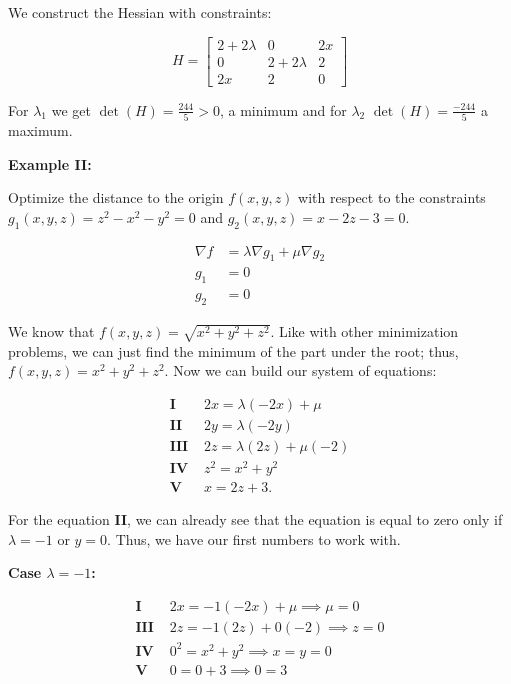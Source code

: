 We construct the Hessian with constraints:

\[
    H = \begin{bmatrix}
    2 + 2\lambda & 0 & 2x \\
    0 & 2 + 2\lambda & 2 \\
    2x & 2 & 0
    \end{bmatrix}
\]

For \(\lambda_1\) we get \( \det(H) =  \frac{244}{5} > 0 \), a minimum 
and for \(\lambda_2\) \(\det(H) = \frac{-244}{5}\) a maximum.

\textbf{Example II:}

Optimize the distance to the origin \(f(x,y,z)\) with respect to the constraints 
\(g_1(x,y,z) = z^2 - x^2 - y^2 = 0\) and \(g_2(x,y,z) = x - 2z - 3 = 0\).

\begin{align*}
    \nabla f &= \lambda \nabla g_1 + \mu \nabla g_2 \\
    g_1 &= 0 \\
    g_2 &= 0 
\end{align*}

We know that \(f(x,y,z) = \sqrt{x^2 + y^2 + z^2}\). Like with other minimization problems, we can 
just find the minimum of the part under the root; thus, \(f(x,y,z) = x^2 + y^2 + z^2\). Now we can 
build our system of equations:

\begin{align*}
    \textbf{I   } &2x = \lambda(-2x) + \mu \\
    \textbf{II  } &2y = \lambda(-2y) \\
    \textbf{III } &2z = \lambda(2z) + \mu(-2) \\
    \textbf{IV  } &z^2 = x^2 + y^2 \\
    \textbf{V   } &x = 2z + 3.   
\end{align*}

For the equation \textbf{II}, we can already see that the equation is equal to zero only if 
\(\lambda = -1\) or \(y = 0\). Thus, we have our first numbers to work with.

\textbf{Case \(\lambda = -1\):}

\begin{align*}
    \textbf{I   } &2x = -1(-2x) + \mu  \implies \mu = 0\\
    \textbf{III } &2z = -1(2z) + 0(-2) \implies z = 0 \\
    \textbf{IV  } &0^2 = x^2 + y^2  \implies x = y = 0\\
    \textbf{V   } &0 = 0 + 3 \implies 0 = 3   
\end{align*}

